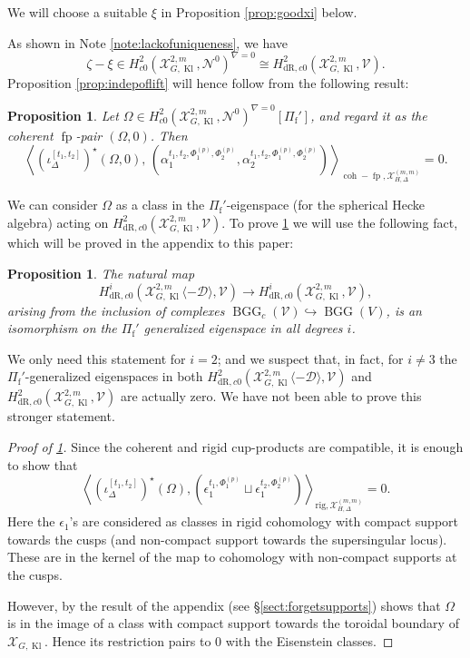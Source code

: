 \documentclass[cjm]{ipart}
\theoremstyle{plain}
\newtheorem{proposition}[theorem]{Proposition}
\theoremstyle{remark}
\DeclareMathOperator{\BGG}{BGG}
\DeclareMathOperator{\coh}{coh}
\DeclareMathOperator{\fp}{fp}
\DeclareMathOperator{\Kl}{Kl}
\newcommand{\Pif}{\Pi_{\mathrm{f}}}
\newcommand{\cD}{\mathcal{D}}
\newcommand{\cN}{\mathcal{N}}
\newcommand{\cV}{\mathcal{V}}
\newcommand{\cX}{\mathcal{X}}
\newcommand{\dR}{\mathrm{dR}}
\newcommand{\into}{\hookrightarrow}
\newcommand{\rig}{\mathrm{rig}}
\numberwithin{equation}{subsection}
\begin{document}
\begin{remark}
 We will choose a suitable $\xi$ in Proposition \ref{prop:goodxi} below.
\end{remark}

 As shown in Note \ref{note:lackofuniqueness}, we have
 \[ \zeta-\xi\in H^2_{c0}(\cX^{2,m}_{G,\Kl},\cN^0)^{\nabla=0}\cong H^2_{\dR,c0}(\cX^{2,m}_{G,\Kl},\cV).\]
 Proposition \ref{prop:indepoflift} will hence follow from the following result:

 \begin{proposition}\label{prop:kernablapairsto0}
  Let $\Omega\in H^2_{c0}(\cX^{2,m}_{G,\Kl},\cN^0)^{\nabla=0}[\Pif']$, and regard it as the coherent $\fp$-pair $(\Omega,0)$. Then
  \[  \left\langle \left(\iota^{[t_1,t_2]}_\Delta\right)^\star(\Omega, 0),\, \left( \alpha^{t_1,t_2,\Phi^{(p)}_1,\Phi^{(p)}_2}_1 , \alpha^{t_1,t_2,\Phi_1^{(p)},\Phi_2^{(p)}}_2\right)\right\rangle_{\coh-\fp,\cX^{(m,m)}_{H,\Delta}}=0.\]
 \end{proposition}

  We can consider $\Omega$ as a class in the $\Pif'$-eigenspace (for the spherical Hecke algebra) acting on $H^2_{\dR, c0}(\cX^{2,m}_{G, \Kl}, \cV)$. To prove \cref{prop:kernablapairsto0} we will use the following fact, which will be proved in the appendix to this paper:
  
  \begin{proposition}
   The natural map
   \[ H^i_{\dR, c0}(\cX^{2,m}_{G, \Kl}\langle -\cD\rangle, \cV) \to H^i_{\dR, c0}(\cX^{2,m}_{G, \Kl}, \cV), \]
   arising from the inclusion of complexes $\BGG_c(\cV) \into \BGG(V)$, is an isomorphism on the $\Pif'$ generalized eigenspace in all degrees $i$.
  \end{proposition}

  \begin{remark}
   We only need this statement for $i = 2$; and we suspect that, in fact, for $i \ne 3$ the $\Pif'$-generalized eigenspaces in both $H^2_{\dR, c0}(\cX^{2,m}_{G, \Kl}\langle -\cD\rangle, \cV)$ and $H^2_{\dR, c0}(\cX^{2,m}_{G, \Kl}, \cV)$ are actually zero. We have not been able to prove this stronger statement.
  \end{remark}

  \begin{proof}[Proof of \cref{prop:kernablapairsto0}]
   Since the coherent and rigid cup-products are compatible, it is enough to show that
   \[
    \left\langle \left(\iota^{[t_1,t_2]}_\Delta\right)^\star(\Omega), \left( \epsilon^{t_1,\Phi^{(p)}_1}_1\sqcup \epsilon^{t_2,\Phi^{(p)}_2}_1\right) \right\rangle_{\rig, \cX_{H, \Delta}^{(m, m)}} = 0.
   \]
   Here the $\epsilon_1$'s are considered as classes in rigid cohomology with compact support towards the cusps (and non-compact support towards the supersingular locus). These are in the kernel of the map to cohomology with non-compact supports at the cusps.
   
   However, by the result of the appendix (see \S\ref{sect:forgetsupports}) shows that $\Omega$ is in the image of a class with compact support towards the toroidal boundary of $\cX_{G, \Kl}$. Hence its restriction pairs to 0 with the Eisenstein classes.
  \end{proof}
\end{document}
